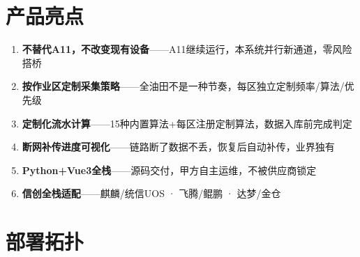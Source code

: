 \documentclass[11pt,a4paper]{ctexart}
\begin{document}
\section{产品亮点}

\begin{enumerate}[leftmargin=*]
  \item \textbf{不替代A11，不改变现有设备}——A11继续运行，本系统并行新通道，零风险搭桥
  \item \textbf{按作业区定制采集策略}——全油田不是一种节奏，每区独立定制频率/算法/优先级
  \item \textbf{定制化流水计算}——15种内置算法+每区注册定制算法，数据入库前完成判定
  \item \textbf{断网补传进度可视化}——链路断了数据不丢，恢复后自动补传，业界独有
  \item \textbf{Python+Vue3全栈}——源码交付，甲方自主运维，不被供应商锁定
  \item \textbf{信创全栈适配}——麒麟/统信UOS · 飞腾/鲲鹏 · 达梦/金仓
\end{enumerate}

\section{部署拓扑}
\end{document}
